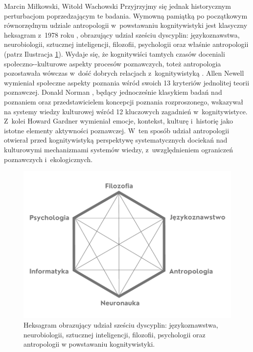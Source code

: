 \begin{artplenv2auth}{Marcin Miłkowski, Witold Wachowski}
Przyjrzyjmy się jednak historycznym perturbacjom poprzedzającym te badania. Wymowną pamiątką po początkowym równorzędnym udziale antropologii w~powstawaniu kognitywistyki jest klasyczny heksagram z~1978 roku
\parencite[zob. np. ][]{miller_cognitive_2003}, %
 obrazujący udział sześciu dyscyplin: językoznawstwa, neurobiologii, sztucznej inteligencji, filozofii, psychologii oraz właśnie antropologii (patrz Ilustracja \ref{fig1milk}). Wydaje się, że kognitywiści tamtych czasów doceniali społeczno-\mbox{-kulturowe} aspekty procesów poznawczych, toteż antropologia pozostawała wówczas w~dość dobrych relacjach z~kognitywistyką 
\parencite[][]{bender_anthropology_2010}. %
 Allen Newell 
\parencites*[][]{newell_physical_1980}[][]{newell_unified_1990} %
 wymieniał społeczne aspekty poznania wśród swoich 13 kryteriów jednolitej teorii poznawczej. Donald Norman 
\parencite*[][]{norman_twelve_1981}, %
 będący jednocześnie klasykiem badań nad poznaniem oraz przedstawicielem koncepcji poznania rozproszonego, wskazywał na systemy wiedzy kulturowej wśród 12 kluczowych zagadnień w~kognitywistyce. Z~kolei Howard Gardner 
\parencite*[][]{gardner_minds_1985} %
 wymieniał emocje, kontekst, kulturę i~historię jako istotne elementy aktywności poznawczej. W~ten sposób udział antropologii otwierał przed kognitywistyką perspektywę systematycznych dociekań nad kulturowymi mechanizmami systemów wiedzy, z~uwzględnieniem ograniczeń poznawczych i~ekologicznych.
 

\begin{figure}
\begin{center}
 \includegraphics[width=.9\textwidth]{ART_milkowski/ilustracja1pu.pdf}
\end{center}
 \caption{Heksagram obrazujący udział sześciu dyscyplin: językoznawstwa, neurobiologii, sztucznej inteligencji, filozofii, psychologii oraz antropologii w powstawaniu kognitywistyki.}\label{fig1milk}
\end{figure}


\end{artplenv2auth}
